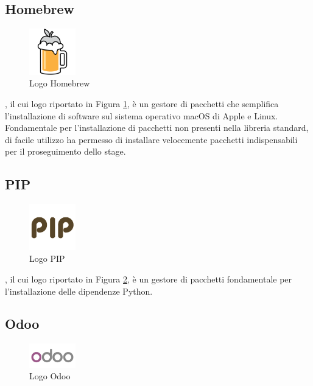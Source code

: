 \subsection{Homebrew}
\begin{figure}[H]
	\begin{center} \includegraphics[width=2cm]{figures/homebrew}
		\caption[Logo Homebrew]{Logo Homebrew}
		\label{logo_homebrew} 
	\end{center}
\end{figure}
, il cui logo riportato in Figura \ref{logo_homebrew}, è un gestore di pacchetti  che semplifica l'installazione di software sul sistema operativo macOS di Apple e Linux. Fondamentale per l'installazione di pacchetti non presenti nella libreria standard, di facile utilizzo ha permesso di installare velocemente pacchetti indispensabili per il proseguimento dello stage.


\subsection{PIP}
\begin{figure}[H]
	\begin{center} \includegraphics[width=2cm]{figures/pip}
		\caption[Logo Pip]{Logo PIP}
		\label{logo_pip} 
	\end{center}
\end{figure}
, il cui logo riportato in Figura \ref{logo_pip}, è un gestore di pacchetti fondamentale per l’installazione delle dipendenze Python.
\newpage

\subsection{Odoo}
\begin{figure}[H]
	\begin{center} \includegraphics[width=2cm]{figures/logo_odoo}
		\caption[Logo Odoo]{Logo Odoo}
		\label{logo_odoo} 
	\end{center}
\end{figure}

